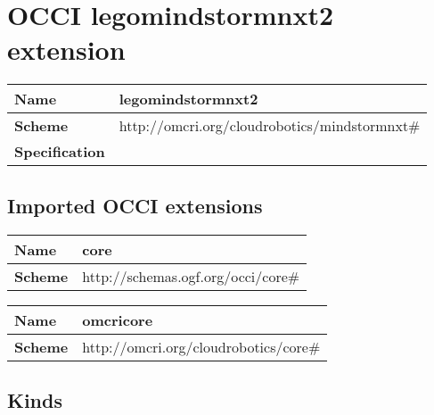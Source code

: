 \section{OCCI legomindstormnxt2 extension}
\begin{center}
\begin{tabular}{|l|l|}
  \hline
  \textbf{Name} & legomindstormnxt2 \\
  \hline  
  \textbf{Scheme} & http://omcri.org/cloudrobotics/mindstormnxt\# \\
  \hline
  \textbf{Specification} &  \\
  \hline
\end{tabular}
\end{center}

\subsection{Imported OCCI extensions}

\begin{center} 
\begin{tabular}{|l|l|}
  \hline
  \textbf{Name} & core \\
  \hline  
  \textbf{Scheme} & http://schemas.ogf.org/occi/core\# \\
  \hline
\end{tabular}
\end{center}
\begin{center} 
\begin{tabular}{|l|l|}
  \hline
  \textbf{Name} & omcricore \\
  \hline  
  \textbf{Scheme} & http://omcri.org/cloudrobotics/core\# \\
  \hline
\end{tabular}
\end{center}


\subsection{Kinds}
